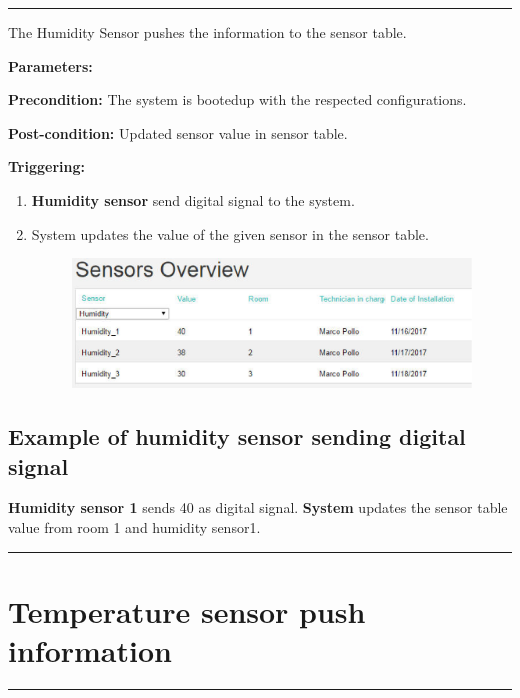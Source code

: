 \hrule
\hfill
\vspace{0.5cm}
\label{operation:Humidty sensor push information}

The Humidity Sensor pushes the information to the sensor table.
\begin{description}
\item \textbf{Parameters:} 
\item \textbf{Precondition:} The system is bootedup with the respected
configurations.
\item \textbf{Post-condition:} Updated sensor value in sensor table.

\item \textbf{Triggering:}
\begin{enumerate}
\item \textbf{Humidity sensor} send digital signal to the system.
\item System updates the value of the given sensor in the sensor table.
\begin{figure}[H]
\includegraphics[width=1\textwidth]{images/HumiditySensor.eps}
\end{figure}
\end{enumerate}
\end{description}

\subsection{Example of humidity sensor sending digital signal}
\textbf{Humidity sensor 1} sends 40 as digital signal. \textbf{System} updates
the sensor table value from room 1 and humidity sensor1.
\hfill
\vspace{0.5cm}
\hrule


\section{Temperature sensor push information}

\hrule
\hfill
\vspace{0.5cm}
\label{operation:Temperature sensor push information}

